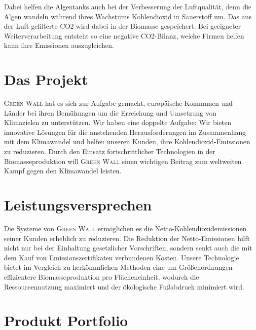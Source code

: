         Dabei helfen die Algentanks auch bei der Verbesserung der Luftqualität, denn die Algen wandeln während ihres Wachstums Kohlendioxid in Sauerstoff um.
        Das aus der Luft gefilterte CO2 wird dabei in der Biomasse gespeichert.
        Bei geeigneter Weiterverarbeitung entsteht so eine negative CO2-Bilanz, welche Firmen helfen kann ihre Emissionen auszugleichen.

    \section{Das Projekt}
        \textsc{Green Wall} hat es sich zur Aufgabe gemacht, europäische Kommunen und Länder bei ihren Bemühungen um die Erreichung und Umsetzung von Klimazielen zu unterstützen.
        Wir haben eine doppelte Aufgabe: Wir bieten innovative Lösungen für die anstehenden Herausforderungen im Zusammenhang mit dem Klimawandel und helfen unseren Kunden, ihre Kohlendioxid-Emissionen zu reduzieren.
        Durch den Einsatz fortschrittlicher Technologien in der Biomasseproduktion will \textsc{Green Wall} einen wichtigen Beitrag zum weltweiten Kampf gegen den Klimawandel leisten.

    \section{Leistungsversprechen}
        Die Systeme von \textsc{Green Wall} ermöglichen es die Netto-Kohlendioxidemissionen seiner Kunden erheblich zu reduzieren.
        Die Reduktion der Netto-Emissionen hilft nicht nur bei der Einhaltung gesetzlicher Vorschriften, sondern senkt auch die mit dem Kauf von Emissionszertifikaten verbundenen Kosten.
        Unsere Technologie bietet im Vergleich zu herkömmlichen Methoden eine um Größenordnungen effizientere Biomasseproduktion pro Flächeneinheit, wodurch die Ressourcennutzung maximiert und der ökologische Fußabdruck minimiert wird.

    \section{Produkt Portfolio}

